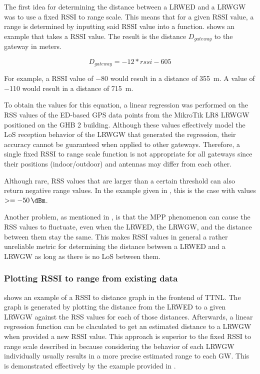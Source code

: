 The first idea for determining the distance between a \acl{LRWED} and a \acl{LRWGW} was to use a fixed \ac{RSSI} to range scale.
This means that for a given \ac{RSSI} value, a range is determined by inputting said \ac{RSSI} value into a function.
 shows an example that takes a \ac{RSSI} value.
The result is the distance $D_{gateway}$ to the gateway in meters.

\begin{equation}\label{eq:fixed-rssi-to-range-scale}
    D_{gateway} = -12 * rssi - 605
\end{equation}

For example, a \ac{RSSI} value of \SI{-80}{\dBm} would result in a distance of \SI{355}{\meter}.
A value of \SI{-110}{\dBm} would result in a distance of \SI{715}{\meter}.

To obtain the values for this equation, a linear regression was performed on the \ac{RSS} values of the \acl{ED}-based GPS data points from the MikroTik LR8 \acl{LRWGW} positioned on the \ac{GHB} 2 building.
Although these values effectively model the \ac{LoS} reception behavior of the \acl{LRWGW} that generated the regression, their accuracy cannot be guaranteed when applied to other gateways.
Therefore, a single fixed \ac{RSSI} to range scale function is not appropriate for all gateways since their positions (indoor/outdoor) and antennas may differ from each other.

Although rare, \ac{RSS} values that are larger than a certain threshold can also return negative range values.
In the example given in , this is the case with values $>=\SI{-50}{\dBm}$.

Another problem, as mentioned in , is that the \ac{MPP} phenomenon can cause the \ac{RSS} values to fluctuate, even when the \acl{LRWED}, the \acl{LRWGW}, and the distance between them stay the same.
This makes RSSI values in general a rather unreliable metric for determining the distance between a \acl{LRWED} and a \acl{LRWGW} as long as there is no \ac{LoS} between them.

\subsubsection{Plotting \acs{RSSI} to range from existing data}\label{sec:plotting-rssi-to-range-from-existing-data}

 shows an example of a \ac{RSSI} to distance graph in the frontend of \ac{TTNL}.
The graph is generated by plotting the distance from the \acl{LRWED} to a given \acl{LRWGW} against the \ac{RSS} values for each of those distances.
Afterwards, a linear regression function can be claculated to get an estimated distance to a \acl{LRWGW} when provided a new \ac{RSSI} value.
This approach is superior to the fixed \ac{RSSI} to range scale described in  because considering the behavior of each \acl{LRWGW} individually usually results in a more precise estimated range to each \acl{GW}.
This is demonstrated effectively by the example provided in .

